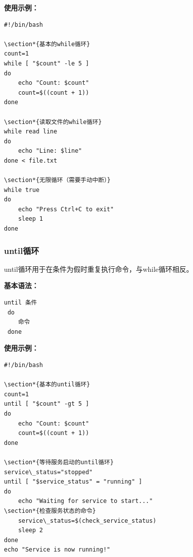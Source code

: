 \documentclass[12pt,UTF8]{ctexbook}
\begin{document}
\textbf{使用示例：}
\begin{verbatim}
#!/bin/bash

\section*{基本的while循环}
count=1
while [ "$count" -le 5 ]
do
    echo "Count: $count"
    count=$((count + 1))
done

\section*{读取文件的while循环}
while read line
do
    echo "Line: $line"
done < file.txt

\section*{无限循环（需要手动中断）}
while true
do
    echo "Press Ctrl+C to exit"
    sleep 1
done
\end{verbatim}

\subsubsection{until循环}
until循环用于在条件为假时重复执行命令，与while循环相反。

\textbf{基本语法：}
\begin{verbatim}
until 条件
 do
    命令
 done
\end{verbatim}

\textbf{使用示例：}
\begin{verbatim}
#!/bin/bash

\section*{基本的until循环}
count=1
until [ "$count" -gt 5 ]
do
    echo "Count: $count"
    count=$((count + 1))
done

\section*{等待服务启动的until循环}
service\_status="stopped"
until [ "$service_status" = "running" ]
do
    echo "Waiting for service to start..."
\section*{检查服务状态的命令}
    service\_status=$(check_service_status)
    sleep 2
done
echo "Service is now running!"
\end{verbatim}
\end{document}

